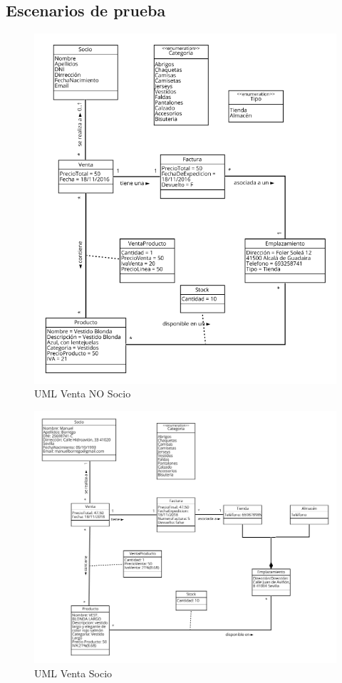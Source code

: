 \subsection{Escenarios de prueba}

\begin{figure}[H]
	\includegraphics[width=\linewidth]{images/pruebas/venta-no-socio.png}
	\caption{UML Venta NO Socio}
\end{figure}

\begin{figure}[H]
	\includegraphics[width=\linewidth]{images/pruebas/venta-socio.png}
	\caption{UML Venta Socio}
\end{figure}

